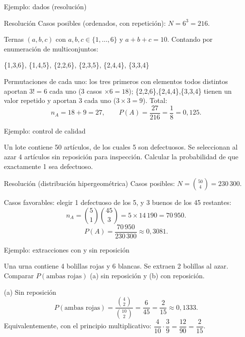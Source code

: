 \documentclass[aspectratio=169,11pt]{beamer}
\begin{document}
\begin{frame}{Ejemplo: dados (resolución)}
\begin{block}{Resolución}
Casos posibles (ordenados, con repetición): $N = 6^3 = 216$.

Ternas $(a,b,c)$ con $a,b,c\in\{1,\dots,6\}$ y $a+b+c=10$. Contando por enumeración de multiconjuntos:
\begin{center}
\{1,3,6\}, \{1,4,5\}, \{2,2,6\}, \{2,3,5\}, \{2,4,4\}, \{3,3,4\}
\end{center}
Permutaciones de cada uno: los tres primeros con elementos todos distintos aportan $3!=6$ cada uno (3 casos $\times 6 = 18$); \{2,2,6\},\{2,4,4\},\{3,3,4\} tienen un valor repetido y aportan $3$ cada uno ($3\times 3=9$). Total:
\[
n_A = 18+9 = 27, \qquad P(A) = \frac{27}{216} = \frac{1}{8} = 0{,}125.
\]
\end{block}
\end{frame}

\begin{frame}{Ejemplo: control de calidad}
\begin{example}
Un lote contiene 50 artículos, de los cuales 5 son defectuosos. Se seleccionan al azar 4 artículos sin reposición para inspección. Calcular la probabilidad de que exactamente 1 sea defectuoso.
\end{example}
\begin{block}{Resolución (distribución hipergeométrica)}
Casos posibles: $N=\binom{50}{4} = 230\,300$.

Casos favorables: elegir 1 defectuoso de los 5, y 3 buenos de los 45 restantes:
\[
n_A = \binom{5}{1}\binom{45}{3} = 5 \times 14\,190 = 70\,950.
\]
\[
P(A) = \frac{70\,950}{230\,300} \approx 0{,}3081.
\]
\end{block}
\end{frame}

\begin{frame}{Ejemplo: extracciones con y sin reposición}
\begin{example}
Una urna contiene 4 bolillas rojas y 6 blancas. Se extraen 2 bolillas al azar. Comparar $P(\text{ambas rojas})$ (a) sin reposición y (b) con reposición.
\end{example}
\begin{block}{(a) Sin reposición}
\[
P(\text{ambas rojas}) = \frac{\binom{4}{2}}{\binom{10}{2}} = \frac{6}{45} = \frac{2}{15}\approx 0{,}1333.
\]
Equivalentemente, con el principio multiplicativo:
$\dfrac{4}{10}\cdot\dfrac{3}{9} = \dfrac{12}{90}=\dfrac{2}{15}$.
\end{block}
\end{frame}
\end{document}
